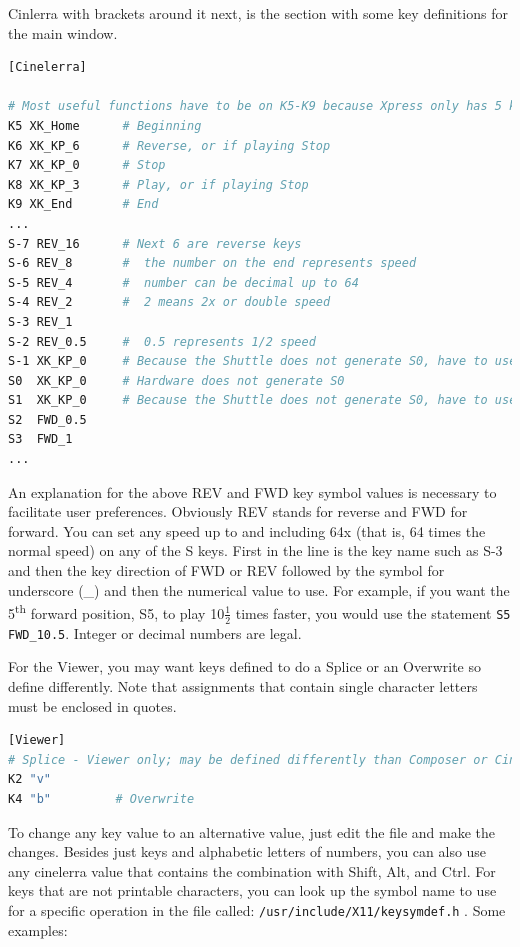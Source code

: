 \noindent Cinlerra with brackets around it next, is the section with some key definitions for the main window.

\begin{lstlisting}[language=Bash]
[Cinelerra] 

# Most useful functions have to be on K5-K9 because Xpress only has 5 keys 
K5 XK_Home      # Beginning 
K6 XK_KP_6      # Reverse, or if playing Stop 
K7 XK_KP_0      # Stop 
K8 XK_KP_3      # Play, or if playing Stop 
K9 XK_End       # End 
... 
S-7 REV_16     	# Next 6 are reverse keys 
S-6 REV_8      	#  the number on the end represents speed
S-5 REV_4      	#  number can be decimal up to 64 
S-4 REV_2      	#  2 means 2x or double speed 
S-3 REV_1 
S-2 REV_0.5    	#  0.5 represents 1/2 speed 
S-1 XK_KP_0    	# Because the Shuttle does not generate S0, have to use S-1 
S0  XK_KP_0   	# Hardware does not generate S0 
S1  XK_KP_0   	# Because the Shuttle does not generate S0, have to use S1 
S2  FWD_0.5 
S3  FWD_1 
... 
\end{lstlisting}

\noindent An explanation for the above REV and FWD key symbol values is necessary to facilitate user preferences.  Obviously REV stands for reverse and FWD for forward.  You can set any speed up to and including 64x (that is, 64 times the normal speed) on any of the S keys.  First in the line is the key name such as S-3 and then the key direction of FWD or REV followed by the symbol for underscore (\_) and then the numerical value to use.  For example, if you want the 5\textsuperscript{th} forward position, S5, to play 10$ \frac{1}{2}$ times faster, you would use the statement \texttt{S5 FWD\_10.5}.  Integer or decimal numbers are legal.

For the Viewer, you may want keys defined to do a Splice or an Overwrite so define differently.  Note that assignments that contain single character letters must be enclosed in quotes.

\begin{lstlisting}[language=Bash]
[Viewer] 
# Splice - Viewer only; may be defined differently than Composer or Cinelerra 
K2 "v"         
K4 "b"         # Overwrite
\end{lstlisting}

\noindent To change any key value to an alternative value, just edit the file and make the changes.  Besides just keys and alphabetic letters of numbers, you can also use any cinelerra value that contains the combination with Shift, Alt, and Ctrl.  For keys that are not printable characters, you can look up the symbol name to use for a specific operation in the file called: \texttt{/usr/include/X11/keysymdef.h} .
\noindent Some examples:

